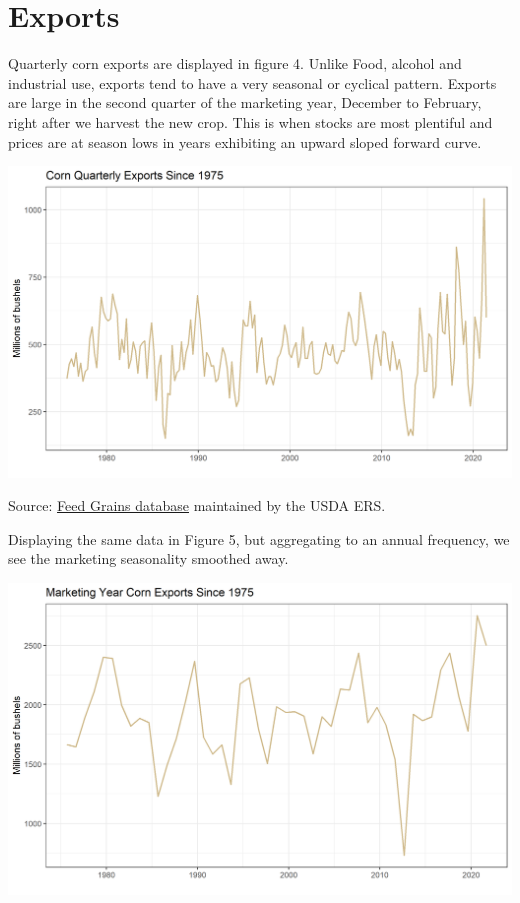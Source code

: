 \documentclass[
  letterpaper,
  DIV=11,
  numbers=noendperiod]{scrreprt}
\begin{document}
\hypertarget{exports}{%
\section{Exports}\label{exports}}

Quarterly corn exports are displayed in figure 4. Unlike Food, alcohol
and industrial use, exports tend to have a very seasonal or cyclical
pattern. Exports are large in the second quarter of the marketing year,
December to February, right after we harvest the new crop. This is when
stocks are most plentiful and prices are at season lows in years
exhibiting an upward sloped forward curve.

\includegraphics{assets/ForecastingUseof-CornUseCategoriesExports.png}

Source:
\href{http://www.ers.usda.gov/data-products/feed-grains-database/feed-grains-yearbook-tables.aspx\#26780}{Feed
Grains database} maintained by the USDA ERS.

Displaying the same data in Figure 5, but aggregating to an annual
frequency, we see the marketing seasonality smoothed away.

\includegraphics{assets/ForecastingUseof-ExportsMY.png}
\end{document}
